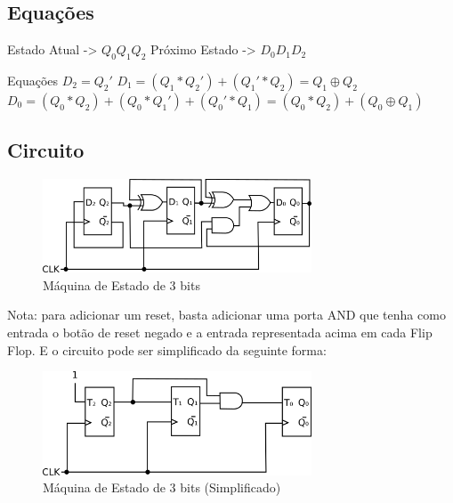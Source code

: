 \documentclass{article}
\begin{document}
        \subsection{Equações}

            Estado Atual -> $Q_0Q_1Q_2$
            \newline
            Próximo Estado -> $D_0D_1D_2$
            \newline

            Equações 
            \newline 
            \newline
            $D_2 = Q_2'$
            \newline
            $D_1 = (Q_1*Q_2')+(Q_1'*Q_2) = Q_1 \oplus Q_2$
            \newline
            $D_0 = (Q_0*Q_2)+(Q_0*Q_1')+(Q_0'*Q_1) = (Q_0*Q_2)+(Q_0 \oplus Q_1)$
    
        \subsection{Circuito}

            \begin{figure} [H] 
                \includegraphics[width=8cm]{circuit-03.png}
                \caption{Máquina de Estado de 3 bits}
                \label{fig:circuit-03}
            \end{figure}

            Nota: para adicionar um reset, basta adicionar uma porta AND que tenha como entrada o botão de reset negado e a entrada representada acima em cada Flip Flop.
            \newline
            E o circuito pode ser simplificado da seguinte forma:

            \begin{figure} [H] 
                \includegraphics[width=8cm]{circuit-03-simple.png}
                \caption{Máquina de Estado de 3 bits (Simplificado)}
                \label{fig:circuit-03-simple}
            \end{figure}   
\end{document}
